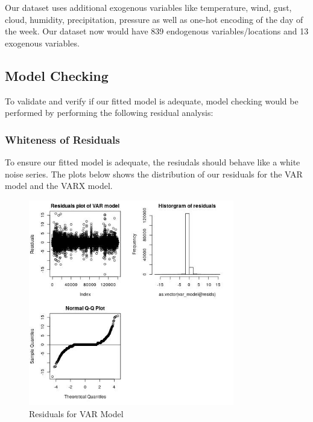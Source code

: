 \documentclass[12pt, letterpaper] {article}
\begin{document}
\noindent Our dataset uses additional exogenous variables like temperature, wind, gust, cloud, humidity, precipitation, pressure as well as one-hot encoding of the day of the week. Our dataset now would have 839 endogenous variables/locations and 13 exogenous variables.  

\subsection{Model Checking}
To validate and verify if our fitted model is adequate, model checking would be performed by performing the following residual analysis:


\subsubsection{Whiteness of Residuals}
To ensure our fitted model is adequate, the resiudals should behave like a white noise series. 
The plots below shows the distribution of our residuals for the VAR model and the VARX model. 

\begin{figure}[H]
    \centering
    \includegraphics[width=0.8\textwidth, height=0.42\textheight]{Images/Full_VAR_diff_resids.jpg}
    \caption{Residuals for VAR Model}
    \label{fig:Residuals for VAR Model}
\end{figure}
\end{document}
